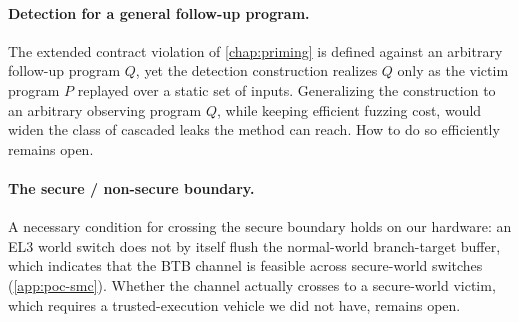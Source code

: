\paragraph{Detection for a general follow-up program.}
The extended contract violation of \autoref{chap:priming} is defined against an arbitrary follow-up
program $Q$, yet the detection construction realizes $Q$ only as the victim program $P$ replayed
over a static set of inputs. Generalizing the construction to an arbitrary
observing program $Q$, while keeping efficient fuzzing cost, would widen the class of
cascaded leaks the method can reach. How to do so efficiently remains open.

\paragraph{The secure / non-secure boundary.}
A necessary condition for crossing the secure boundary holds on our hardware: an EL3 world
switch does not by itself flush the normal-world branch-target buffer, which indicates that the BTB channel
is feasible across secure-world switches (\autoref{app:poc-smc}). Whether the channel actually crosses to a secure-world victim, which requires a
trusted-execution vehicle we did not have, remains open.

